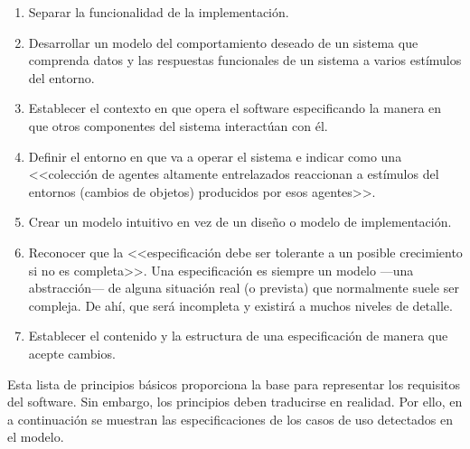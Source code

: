 		\begin{enumerate}
			\item {Separar la funcionalidad de la implementación.}
			\item {Desarrollar un modelo del comportamiento deseado de un sistema que comprenda datos y las respuestas funcionales de un sistema a varios estímulos del entorno.}
			\item {Establecer el contexto en que opera el software especificando la manera en que otros componentes del sistema interactúan con él.}
			\item {Definir el entorno en que va a operar el sistema e indicar como una <<colección de agentes altamente entrelazados reaccionan a estímulos del entornos (cambios de objetos) producidos por esos agentes>>.}
			\item {Crear un modelo intuitivo en vez de un diseño o modelo de implementación.}
			\item {Reconocer que la <<especificación debe ser tolerante a un posible crecimiento si no es completa>>. Una especificación es siempre un modelo ---una abstracción--- de alguna situación real (o prevista) que normalmente suele ser compleja. De ahí, que será incompleta y existirá a muchos niveles de detalle.}
			\item {Establecer el contenido y la estructura de una especificación de manera que acepte cambios.}
		\end{enumerate}
		
		Esta lista de principios básicos proporciona la base para representar los requisitos del software. Sin embargo, los principios deben traducirse en realidad. Por ello, en a continuación se muestran las especificaciones de los casos de uso detectados en el modelo.
		
